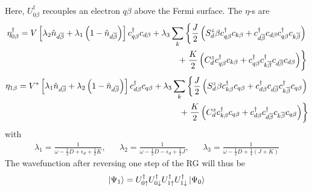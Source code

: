 \documentclass[12pt,twoside]{article}
\numberwithin{equation}{section}
\begin{document}
Here, \(U^\dagger_{0\beta}\) recouples an electron \(q\beta\) above the Fermi surface. The \(\eta\)-s are
\begin{equation}\begin{aligned}
	\eta_{0\beta}^\dagger = V \left[\lambda_2 \hat n_{d\overline\beta} + \lambda_1 \left( 1 - \hat n_{d\overline\beta} \right)  \right]c^\dagger_{q\beta}c_{d\beta} + \lambda_3 \sum_{k} \left\{ \frac{J}{2}\left( S_d^z \beta c^\dagger_{q\beta}c_{k\beta} + c^\dagger_{d\overline\beta}c_{d\beta}c^\dagger_{q\beta}c_{k\overline\beta}\right) \right.\\
	+ \left.\frac{K}{2}\left( C^z_d c^\dagger_{q\beta}c_{k\beta} + c^\dagger_{q\beta}c^\dagger_{k\overline\beta}c_{d\overline\beta}c_{d\beta} \right) \right\} \\
\end{aligned}\end{equation}
\begin{equation}\begin{aligned}
	\eta_{1\beta} = V^* \left[\lambda_1 \hat n_{d\overline\beta} + \lambda_2 \left( 1 - \hat n_{d\overline\beta} \right)  \right]c^\dagger_{d\beta}c_{q\beta} + \lambda_3 \sum_{k} \left\{ \frac{J}{2}\left( S_d^z \beta c^\dagger_{k\beta}c_{q\beta} + c^\dagger_{d\beta}c_{d\overline\beta}c^\dagger_{k\overline\beta}c_{q\beta}\right) \right.\\
	+ \left.\frac{K}{2}\left( C^z_d c^\dagger_{k\beta}c_{q\beta} + c^\dagger_{d\beta}c^\dagger_{d\overline\beta}c_{k\overline\beta}c_{q\beta} \right) \right\} \\
\end{aligned}\end{equation}
with
\begin{equation}\begin{aligned}
	\lambda_1 = \frac{1}{\omega - \frac{1}{2}D + \epsilon_d + \frac{1}{2}K}, && \lambda_2 = \frac{1}{\omega - \frac{1}{2}D - \epsilon_d + \frac{1}{2}J}, && \lambda_3 = \frac{1}{\omega - \frac{1}{2}D + \frac{1}{4}\left(J + K\right)} 
\end{aligned}\end{equation}
The wavefunction after reversing one step of the RG will thus be
\begin{equation}\begin{aligned}
	\ket{\Psi_1} = U^\dagger_{0 \uparrow}U^\dagger_{0 \downarrow}U^\dagger_{1 \uparrow}U^\dagger_{1 \downarrow}\ket{\Psi_0}
\end{aligned}\end{equation}
\end{document}
